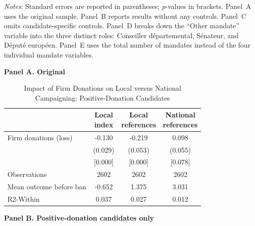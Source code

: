 \documentclass[12pt,a4paper]{article}
\begin{document}
\begin{table}[H]
\vspace{1mm}
\begin{flushleft}
\footnotesize
\justifying
\textit{Notes}: Standard errors are reported in parentheses; \textit{p}-values in brackets.  
Panel~A uses the original sample.  
Panel~B reports results without any controls.  
Panel~C omits candidate-specific controls.  
Panel~D breaks down the ``Other mandate'' variable into the three distinct roles: Conseiller départemental, Sénateur, and Député européen.  
Panel~E uses the total number of mandates instead of the four individual mandate variables.
\end{flushleft}
\end{table}


\begin{table}[!htbp]\centering
\caption{Impact of Firm Donations on Local versus National Campaigning: Positive-Donation Candidates}
\label{tab:don_local_nat_positive}

\bigskip
\textbf{Panel A. Original}\\[1mm]

{
\def\sym#1{\ifmmode^{#1}\else\(^{#1}\)\fi}
\begin{tabular}{lccc}
\hline \hline
                & \shortstack{Local\\index}
                & \shortstack{Local\\references}
                & \shortstack{National\\references} \\
\hline
Firm donations (loss)
                &   -0.130          &   -0.219          &    0.098  \\
                &   (0.029)         &   (0.053)         &   (0.055)        \\
                &   [0.000]         &   [0.000]         &   [0.078]        \\
Observations    &     2602           &     2602           &     2602         \\
Mean outcome before ban
                &    -0.652          &     1.375          &     3.031        \\
R2-Within       &     0.037          &     0.027          &     0.012        \\
\hline \hline
\end{tabular}
}

\bigskip
\textbf{Panel B. Positive-donation candidates only}\\[1mm]


\end{table}
\end{document}
